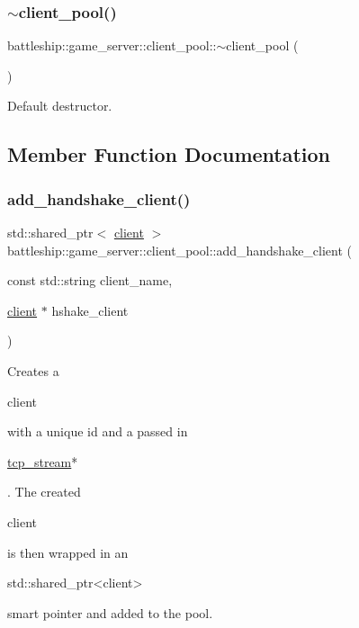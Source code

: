 \subsubsection{\texorpdfstring{$\sim$client\+\_\+pool()}{~client\_pool()}}
{\footnotesize\ttfamily battleship\+::game\+\_\+server\+::client\+\_\+pool\+::$\sim$client\+\_\+pool (\begin{DoxyParamCaption}{ }\end{DoxyParamCaption})\hspace{0.3cm}{\ttfamily [inline]}}

Default destructor. 

\subsection{Member Function Documentation}
\mbox{\label{classbattleship_1_1game__server_1_1client__pool_a08f63f68adf4fb458e0e3bc8336a19d2}} 
\subsubsection{\texorpdfstring{add\+\_\+handshake\+\_\+client()}{add\_handshake\_client()}}
{\footnotesize\ttfamily std\+::shared\+\_\+ptr$<$ \hyperlink{classbattleship_1_1game__server_1_1client}{client} $>$ battleship\+::game\+\_\+server\+::client\+\_\+pool\+::add\+\_\+handshake\+\_\+client (\begin{DoxyParamCaption}\item[{const std\+::string}]{client\+\_\+name,  }\item[{\hyperlink{classbattleship_1_1game__server_1_1client}{client} $\ast$}]{hshake\+\_\+client }\end{DoxyParamCaption})}

Creates a
\begin{DoxyCode}
client 
\end{DoxyCode}
 with a unique id and a passed in
\begin{DoxyCode}
\hyperlink{classtcp__stream}{tcp\_stream}* 
\end{DoxyCode}
 . The created
\begin{DoxyCode}
client 
\end{DoxyCode}
 is then wrapped in an 
\begin{DoxyCode}
std::shared\_ptr<client> 
\end{DoxyCode}
 smart pointer and added to the pool.


